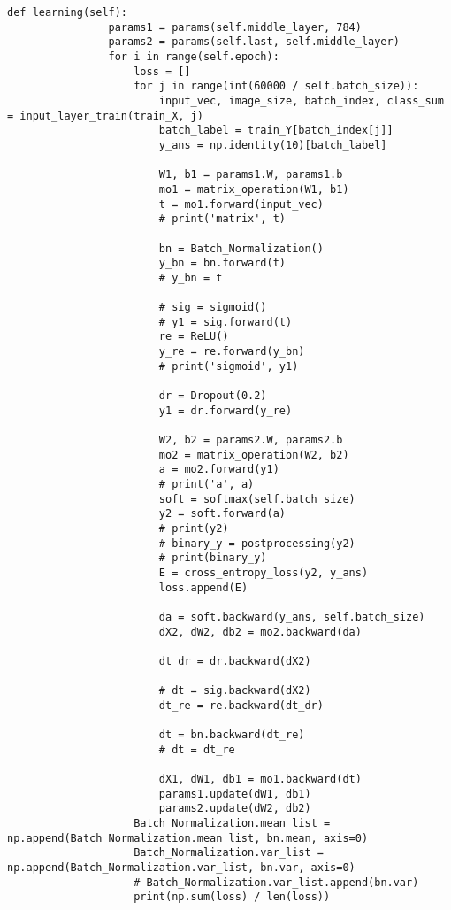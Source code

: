 \documentclass[a4j, titlepage]{jarticle}
\begin{document}
\begin{itemize}
\begin{lstlisting}[caption=3層ニューラルネットワークの構成 ,label=fuga]
            def learning(self):
                params1 = params(self.middle_layer, 784)
                params2 = params(self.last, self.middle_layer)
                for i in range(self.epoch):
                    loss = []
                    for j in range(int(60000 / self.batch_size)):
                        input_vec, image_size, batch_index, class_sum = input_layer_train(train_X, j)
                        batch_label = train_Y[batch_index[j]]
                        y_ans = np.identity(10)[batch_label]

                        W1, b1 = params1.W, params1.b
                        mo1 = matrix_operation(W1, b1)
                        t = mo1.forward(input_vec)
                        # print('matrix', t)

                        bn = Batch_Normalization()
                        y_bn = bn.forward(t)
                        # y_bn = t

                        # sig = sigmoid()
                        # y1 = sig.forward(t)
                        re = ReLU()
                        y_re = re.forward(y_bn)
                        # print('sigmoid', y1)

                        dr = Dropout(0.2)
                        y1 = dr.forward(y_re)

                        W2, b2 = params2.W, params2.b
                        mo2 = matrix_operation(W2, b2)
                        a = mo2.forward(y1)
                        # print('a', a)
                        soft = softmax(self.batch_size)
                        y2 = soft.forward(a)
                        # print(y2)
                        # binary_y = postprocessing(y2)
                        # print(binary_y)
                        E = cross_entropy_loss(y2, y_ans)
                        loss.append(E)

                        da = soft.backward(y_ans, self.batch_size)
                        dX2, dW2, db2 = mo2.backward(da)

                        dt_dr = dr.backward(dX2)

                        # dt = sig.backward(dX2)
                        dt_re = re.backward(dt_dr)

                        dt = bn.backward(dt_re)
                        # dt = dt_re

                        dX1, dW1, db1 = mo1.backward(dt)
                        params1.update(dW1, db1)
                        params2.update(dW2, db2)
                    Batch_Normalization.mean_list = np.append(Batch_Normalization.mean_list, bn.mean, axis=0)
                    Batch_Normalization.var_list = np.append(Batch_Normalization.var_list, bn.var, axis=0)
                    # Batch_Normalization.var_list.append(bn.var)
                    print(np.sum(loss) / len(loss))


\end{lstlisting}
\end{itemize}
\end{document}
